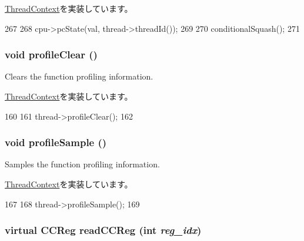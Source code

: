 \hyperlink{classThreadContext_aaeee41ee07ac94c41a94512f28a431fa}{ThreadContext}を実装しています。


\begin{DoxyCode}
267 {
268     cpu->pcState(val, thread->threadId());
269 
270     conditionalSquash();
271 }
\end{DoxyCode}
\hypertarget{classO3ThreadContext_acf9c88860776d7bd752317e8b550a5d5}{
\subsubsection[{profileClear}]{\setlength{\rightskip}{0pt plus 5cm}void profileClear ()}}
\label{classO3ThreadContext_acf9c88860776d7bd752317e8b550a5d5}
Clears the function profiling information. 

\hyperlink{classThreadContext_ac9ebb698bd789f38c55af10256aab7e8}{ThreadContext}を実装しています。


\begin{DoxyCode}
160 {
161     thread->profileClear();
162 }
\end{DoxyCode}
\hypertarget{classO3ThreadContext_aba547b904bdcf83196f983f79d285caf}{
\subsubsection[{profileSample}]{\setlength{\rightskip}{0pt plus 5cm}void profileSample ()}}
\label{classO3ThreadContext_aba547b904bdcf83196f983f79d285caf}
Samples the function profiling information. 

\hyperlink{classThreadContext_a46e9ef08695527c8b4bd0e668bced5a8}{ThreadContext}を実装しています。


\begin{DoxyCode}
167 {
168     thread->profileSample();
169 }
\end{DoxyCode}
\hypertarget{classO3ThreadContext_a490d3d7eda13841557ca14eb877f6236}{
\subsubsection[{readCCReg}]{\setlength{\rightskip}{0pt plus 5cm}virtual {\bf CCReg} readCCReg (int {\em reg\_\-idx})}}
\label{classO3ThreadContext_a490d3d7eda13841557ca14eb877f6236}


